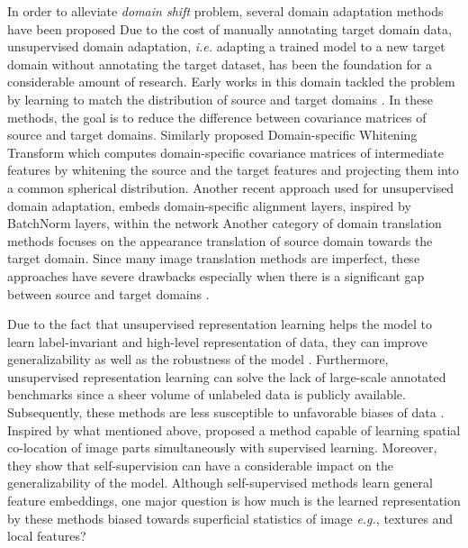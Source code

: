 \documentclass[10pt,twocolumn,letterpaper]{article}
\begin{document}
In order to alleviate \textit{domain shift} problem, several domain adaptation methods have been proposed \cite{csurka2017domain, pan2009survey, wang2018deep}
Due to the cost of manually annotating target domain data, unsupervised domain adaptation, \textit{i.e.} adapting a trained model to a new target domain without annotating the target dataset, has been the foundation for a considerable amount of research.
Early works in this domain tackled the problem by learning to match the distribution of source and target domains \cite{sun2016deep, morerio2017minimal}.
In these methods, the goal is to reduce the difference between covariance matrices of source and target domains.
Similarly \cite{roy2019unsupervised} proposed Domain-specific Whitening Transform which computes domain-specific covariance matrices of intermediate
features by whitening the source and the target
features and projecting them into a common spherical distribution.
Another recent approach used for unsupervised domain adaptation, embeds domain-specific alignment layers, inspired by BatchNorm\cite{ioffe2015batch} layers, within the network \cite{cariucci2017autodial,mancini2018boosting}
Another category of domain translation methods focuses on the appearance translation of source domain towards the target domain.
Since many image translation methods are imperfect, these approaches have severe drawbacks especially when there is a significant gap between source and target domains \cite{bousmalis2017unsupervised, hoffman2017cycada, russo2018source}.

Due to the fact that unsupervised representation learning helps the model to learn label-invariant and high-level representation of data, they can improve generalizability as well as the robustness of the model \cite{carlucci2019domain, hendrycks2019using}. 
Furthermore, unsupervised representation learning can solve the lack of large-scale annotated benchmarks since a sheer volume of unlabeled data is publicly available. Subsequently, these methods are less susceptible to unfavorable biases of data \cite{torralba2011unbiased}.
Inspired by what mentioned above, \cite{carlucci2019domain} proposed a method capable of learning spatial co-location of image parts simultaneously with supervised learning. Moreover, they show that self-supervision can have a considerable impact on the generalizability of the model.
Although self-supervised methods learn general feature embeddings, one major question is how much is the learned  representation by these methods biased towards superficial statistics of image \textit{e.g.}, textures and local features?
\end{document}
